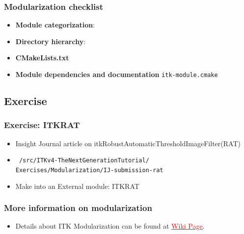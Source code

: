 \begin{frame}[fragile]
\frametitle{Modularization checklist}
\begin{itemize}
\item<1->\textbf{Module categorization}: 
\item<4->\textbf{Directory hierarchy}: 
\item<8->\textbf{CMakeLists.txt} 
\item<12->\textbf{Module dependencies and documentation} \texttt{itk-module.cmake}
\end{itemize}
\end{frame}


\subsection{Exercise}
\begin{frame}
\frametitle{Exercise: ITKRAT}
\small
\begin{itemize}
\item  Insight Journal article on itkRobustAutomaticThresholdImageFilter(RAT)
\item
\texttt{~/src/ITKv4-TheNextGenerationTutorial/}\\
\texttt{Exercises/Modularization/IJ-submission-rat}
\item  Make into an External module: ITKRAT
\end{itemize}
\end{frame}


\begin{frame}
\frametitle{More information on modularization}
\begin{itemize}
\item  Details about ITK Modularization can be found at \href{http://www.itk.org/Wiki/ITK\_Release\_4/Modularization}{\textcolor{red}{\underline{Wiki Page}}}.
\end{itemize}
\end{frame}
